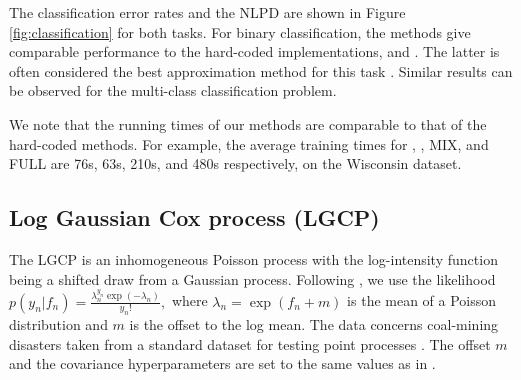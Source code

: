 The classification error rates and the NLPD are shown in Figure  \ref{fig:classification} for both tasks.
For binary classification, the \agp \space methods give comparable performance 
to the hard-coded implementations, \vbo \space and \ep. The latter is often considered the best approximation method for this task \cite{nickisch2008approximations}.
Similar results can be observed for the multi-class classification problem.

We note that the running times of our methods are  comparable to that of the hard-coded methods.
For example, the average training times for \vbo, \ep, MIX, and FULL are 76s, 63s, 210s, and 480s respectively, on the Wisconsin dataset.



\subsection{Log Gaussian Cox process (LGCP) \label{sec:lgcp}}
The LGCP is an inhomogeneous Poisson process with the log-intensity function being a shifted draw from a Gaussian process.
Following \cite{murray2009elliptical}, we use the likelihood $p(y_n | f_n) = \frac{\lambda_n^{y_n} \exp(-\lambda_n)}{y_n!},$ where $\lambda_n = \exp(f_n + m)$ is the mean of a Poisson distribution and $m$ is the offset to the log mean. 
The data concerns  coal-mining disasters taken from a standard dataset for testing point processes \cite{jarrett1979note}.
The offset $m$ and the covariance hyperparameters are set to the same values as in \cite{murray2009elliptical}.

